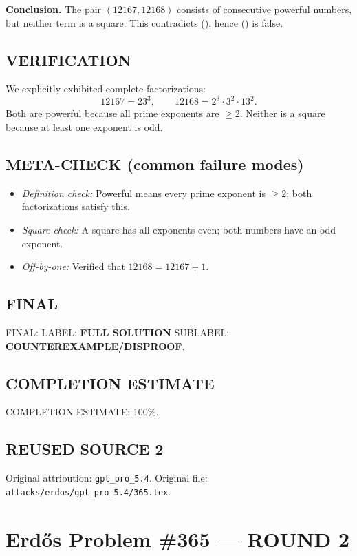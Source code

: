 \medskip
\noindent\textbf{Conclusion.}
The pair $(12167,12168)$ consists of consecutive powerful numbers, but neither term is a square. This contradicts (\*), hence (\*) is false.

\subsection*{VERIFICATION}
We explicitly exhibited complete factorizations:
\[
12167 = 23^3,\qquad 12168 = 2^3\cdot 3^2\cdot 13^2.
\]
Both are powerful because all prime exponents are $\ge 2$. Neither is a square because at least one exponent is odd.

\subsection*{META-CHECK (common failure modes)}
\begin{itemize}
\item \emph{Definition check:} Powerful means every prime exponent is $\ge 2$; both factorizations satisfy this.
\item \emph{Square check:} A square has all exponents even; both numbers have an odd exponent.
\item \emph{Off-by-one:} Verified that $12168=12167+1$.
\end{itemize}

\subsection*{FINAL}
FINAL: LABEL: \textbf{FULL SOLUTION} \quad SUBLABEL: \textbf{COUNTEREXAMPLE/DISPROOF}.

\subsection*{COMPLETION ESTIMATE}
COMPLETION ESTIMATE: 100\%.



\subsection*{REUSED SOURCE 2}
Original attribution: \texttt{gpt\_pro\_5.4}.
Original file: \texttt{attacks/erdos/gpt\_pro\_5.4/365.tex}.

\section*{Erd\H{o}s Problem \#365 --- ROUND 2}

